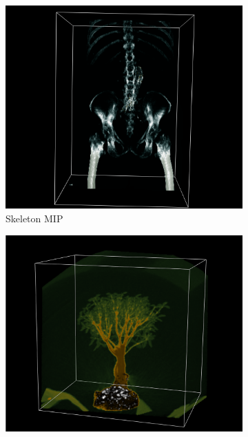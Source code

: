 \documentclass[a4paper,twoside,11pt]{article}
\begin{document}
\begin{figure}[h!]
    \begin{center}
        \begin{subfigure}[b]{0.32\textwidth}
            \includegraphics[width=\textwidth]{SanderImages/SkeletonMIPZ.png}
            \caption{Skeleton MIP}
            \label{fig:Skeleton}
        \end{subfigure}
        \begin{subfigure}[b]{0.33\textwidth}
            \includegraphics[width=\textwidth]{SanderImages/BonsaiMIPZ.png}

\end{subfigure}
\end{center}
\end{figure}
\end{document}
